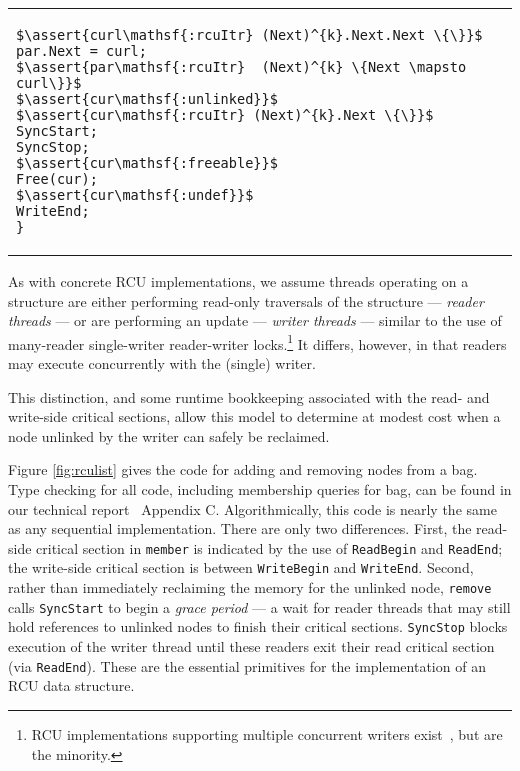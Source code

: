 \begin{figure*}[t!]
\begin{tabular}{p{}p{}}
\begin{lstlisting}[basicstyle=\scriptsize\ttfamily]
$\assert{curl\mathsf{:rcuItr} (Next)^{k}.Next.Next \{\}}$
par.Next = curl;
$\assert{par\mathsf{:rcuItr}  (Next)^{k} \{Next \mapsto curl\}}$
$\assert{cur\mathsf{:unlinked}}$
$\assert{cur\mathsf{:rcuItr} (Next)^{k}.Next \{\}}$
SyncStart;
SyncStop;
$\assert{cur\mathsf{:freeable}}$
Free(cur);
$\assert{cur\mathsf{:undef}}$
WriteEnd;
}
\end{lstlisting}
\end{tabular}
\vspace{-2em}
\caption{RCU client: singly linked list based bag implementation.}
\label{fig:rculist}
\end{figure*}

As with concrete RCU implementations, we assume threads operating on a structure are either performing read-only traversals of the structure --- \emph{reader threads} --- or are performing an update --- \emph{writer threads} --- similar to the use of many-reader single-writer reader-writer locks.\footnote{RCU implementations supporting multiple concurrent writers exist~\cite{Arbel:2014:CUR:2611462.2611471}, but are the minority.}  It differs, however, in that readers may execute concurrently with the (single) writer.

This distinction, and some runtime bookkeeping associated with the read- and write-side critical sections, allow this model to determine at modest cost when a node unlinked by the writer can safely be reclaimed.

Figure \ref{fig:rculist} gives the code for adding and removing nodes from a bag. Type checking for all code, including membership queries for bag, can be found in our technical report~\cite{isotek} Appendix C. Algorithmically, this code is nearly the same as any sequential implementation. There are only two differences.
First, the read-side critical section in \texttt{member} is indicated by the use of \lstinline|ReadBegin| and \lstinline|ReadEnd|; the write-side critical section is between \lstinline|WriteBegin| and \lstinline|WriteEnd|.
Second, rather than immediately reclaiming the memory for the unlinked node, \texttt{remove} calls \lstinline|SyncStart| to begin a \emph{grace period} --- a wait for reader threads that may still hold references to unlinked nodes to finish their critical sections.
 \lstinline|SyncStop| blocks execution of the writer thread until these readers exit their read critical section (via \lstinline|ReadEnd|). These are the essential primitives for the implementation of an RCU data structure.

